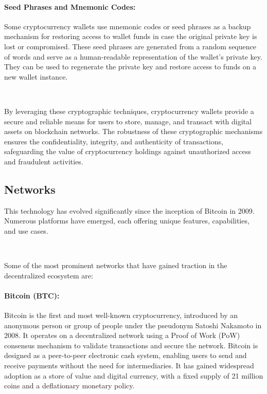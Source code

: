 \paragraph{Seed Phrases and Mnemonic Codes:}
Some cryptocurrency wallets use mnemonic codes or seed phrases as a backup mechanism for restoring access to wallet funds in case the original private key is lost or compromised. These seed phrases are generated from a random sequence of words and serve as a human-readable representation of the wallet's private key. They can be used to regenerate the private key and restore access to funds on a new wallet instance.

~

By leveraging these cryptographic techniques, cryptocurrency wallets provide a secure and reliable means for users to store, manage, and transact with digital assets on blockchain networks. The robustness of these cryptographic mechanisms ensures the confidentiality, integrity, and authenticity of transactions, safeguarding the value of cryptocurrency holdings against unauthorized access and fraudulent activities.

\subsection{Networks}
\label{subsec:networks}

This technology has evolved significantly since the inception of Bitcoin in 2009. Numerous platforms have emerged, each offering unique features, capabilities, and use cases.

~

Some of the most prominent networks that have gained traction in the decentralized ecosystem are:

\paragraph{Bitcoin (BTC):}
Bitcoin is the first and most well-known cryptocurrency, introduced by an anonymous person or group of people under the pseudonym Satoshi Nakamoto in 2008. It operates on a decentralized network using a Proof of Work (PoW) consensus mechanism to validate transactions and secure the network. Bitcoin is designed as a peer-to-peer electronic cash system, enabling users to send and receive payments without the need for intermediaries. It has gained widespread adoption as a store of value and digital currency, with a fixed supply of 21 million coins and a deflationary monetary policy.


